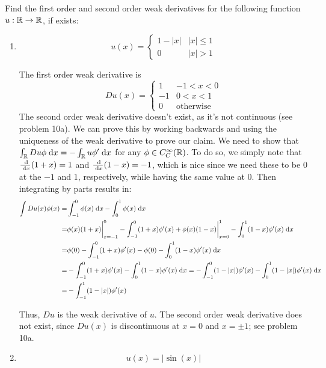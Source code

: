 Find the first order and second order weak derivatives for the following function $u: \mathbb{R} \rightarrow \mathbb{R}$, if exists:

\begin{enumerate}
\item
  $$
  u(x) =
  \begin{cases}
    1 - |x| & |x| \leq 1\\
    0 & |x| > 1
  \end{cases}
  $$

  The first order weak derivative is
  $$
  Du(x) =
  \begin{cases}
    1 & -1 < x < 0\\
    -1 & 0 < x < 1\\
    0 & \text{otherwise}
  \end{cases}
  $$
  The second order weak derivative doesn't exist, as it's not continuous (see problem 10a).
  We can prove this by working backwards and using the uniqueness of the weak derivative to prove our claim.
  We need to show that $\int_{\mathbb{R}} Du \phi \;\mathrm{d}x = -\int_{\mathbb{R}} u \phi' \;\mathrm{d}x$ for any $\phi \in C_C^\infty(\mathbb{R})$.
  To do so, we simply note that $\frac{\;\mathrm{d}}{\;\mathrm{d}x}(1 + x) = 1$ and $\frac{\;\mathrm{d}}{\;\mathrm{d}x}(1 - x) = -1$,
  which is nice since we need these to be $0$ at the $-1$ and $1$, respectively, while having the same value at $0$.
  Then integrating by parts results in:
  \begin{align*}
    \int Du(x) \phi(x) = &\int_{-1}^0 \phi(x) \;\mathrm{d}x - \int_0^1 \phi(x) \;\mathrm{d}x\\
                       = &\phi(x) (1 + x) \bigg\rvert_{x=-1}^{0} - \int_{-1}^0 (1 + x) \phi'(x)
                          + \phi(x) (1 - x) \bigg\rvert_{x=0}^{1} - \int_0^1 (1 - x) \phi'(x) \;\mathrm{d}x\\
                       = &\phi(0) - \int_{-1}^0 (1 + x) \phi'(x) - \phi(0) - \int_0^1 (1 - x) \phi'(x) \;\mathrm{d}x\\
                       = &-\int_{-1}^0 (1 + x) \phi'(x) - \int_0^1 (1 - x) \phi'(x) \;\mathrm{d}x
                       = -\int_{-1}^0 (1 - |x|) \phi'(x) - \int_0^1 (1 - |x|) \phi'(x) \;\mathrm{d}x\\
                       = &-\int_{-1}^1 (1 - |x|) \phi'(x)
  \end{align*}

  Thus, $Du$ is the weak derivative of $u$.
  The second order weak derivative does not exist, since $Du(x)$ is discontinuous at $x = 0$ and $x = \pm 1$; see problem 10a.

\item
  $$
  u(x) = |\sin(x)|
  $$


\end{enumerate}
